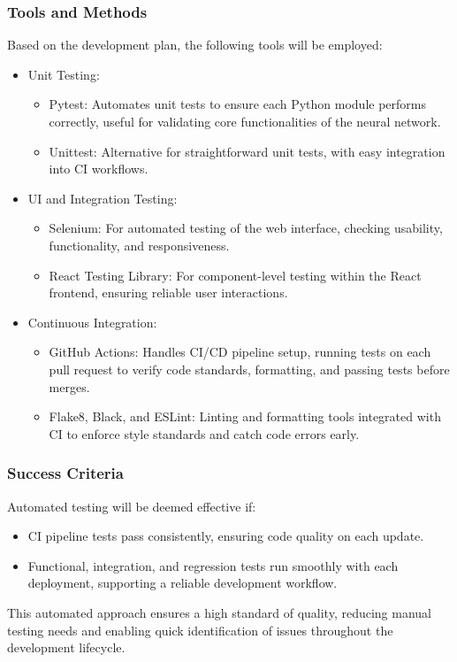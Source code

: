 \documentclass[12pt, titlepage]{article}
\begin{document}
\subsubsection{Tools and Methods}
Based on the development plan, the following tools will be employed:
\begin{itemize}
  \item Unit Testing:
    \begin{itemize}
      \item Pytest: Automates unit tests to ensure each Python module performs correctly, useful for validating core functionalities of the neural network.
      \item Unittest: Alternative for straightforward unit tests, with easy integration into CI workflows.
    \end{itemize}
  \item UI and Integration Testing:
    \begin{itemize}
      \item Selenium: For automated testing of the web interface, checking usability, functionality, and responsiveness.
      \item React Testing Library: For component-level testing within the React frontend, ensuring reliable user interactions.
    \end{itemize}
  \item Continuous Integration:
    \begin{itemize}
      \item GitHub Actions: Handles CI/CD pipeline setup, running tests on each pull request to verify code standards, formatting, and passing tests before merges.
      \item Flake8, Black, and ESLint: Linting and formatting tools integrated with CI to enforce style standards and catch code errors early.
    \end{itemize}
\end{itemize}

\subsubsection{Success Criteria}
Automated testing will be deemed effective if:
\begin{itemize}
  \item CI pipeline tests pass consistently, ensuring code quality on each update.
  \item Functional, integration, and regression tests run smoothly with each deployment, supporting a reliable development workflow.
\end{itemize}
This automated approach ensures a high standard of quality, reducing manual testing needs and enabling quick identification of issues throughout the development lifecycle.
\end{document}
